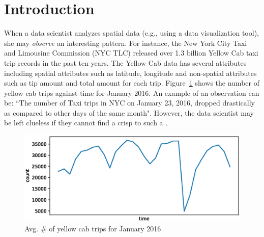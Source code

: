 \label{sec:Intro}
\section{Introduction}

When a data scientist analyzes spatial data (e.g., using a data visualization tool), she may {\em observe} an interesting pattern. 
For instance, the New York City Taxi and Limousine Commission (NYC TLC)\cite{taxi2016tlc} released over 1.3 billion Yellow Cab taxi trip records in the past ten years. The Yellow Cab data has several attributes including spatial attributes such as latitude, longitude and non-spatial attributes such as tip amount and total amount for each trip. Figure~\ref{fig:yellowstats} shows the number of yellow cab trips against time for January 2016. 
An example of an observation can be: ``The number of Taxi trips in NYC on January 23, 2016, dropped drastically as compared to other days of the same month". However, the data scientist may be left clueless if they cannot find a crisp {\explanation} to such a {\fact}. 
\begin{figure}[htp]
	\includegraphics[width=\columnwidth]{images/yellowdata_count.eps}
	\caption{Avg. \# of yellow cab trips for January 2016}
	\label{fig:yellowstats}
\end{figure}
